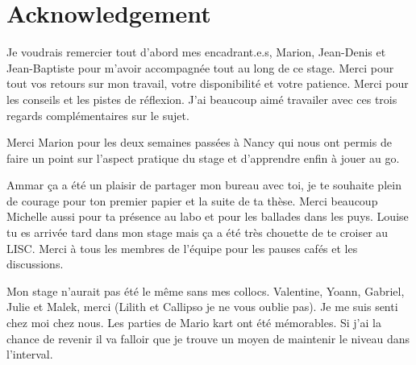 \section*{Acknowledgement}

Je voudrais remercier tout d'abord mes encadrant.e.s, Marion, Jean-Denis et Jean-Baptiste pour m'avoir accompagnée tout au long de ce stage. Merci pour tout vos retours sur mon travail, votre disponibilité et votre patience. Merci pour les conseils et les pistes de réflexion. J'ai beaucoup aimé travailer avec ces trois regards complémentaires sur le sujet.

Merci Marion pour les deux semaines passées à Nancy qui nous ont permis de faire un point sur l'aspect pratique du stage et d'apprendre enfin à jouer au go.

Ammar ça a été un plaisir de partager mon bureau avec toi, je te souhaite plein de courage pour ton premier papier et la suite de ta thèse. Merci beaucoup Michelle aussi pour ta présence au labo et pour les ballades dans les puys. Louise tu es arrivée tard dans mon stage mais ça a été très chouette de te croiser au LISC. Merci à tous les membres de l'équipe pour les pauses cafés et les discussions.

Mon stage n'aurait pas été le même sans mes collocs. Valentine, Yoann, Gabriel, Julie et Malek, merci (Lilith et Callipso je ne vous oublie pas). Je me suis senti chez moi chez nous. Les parties de Mario kart ont été mémorables. Si j'ai la chance de revenir il va falloir que je trouve un moyen de maintenir le niveau dans l'interval.